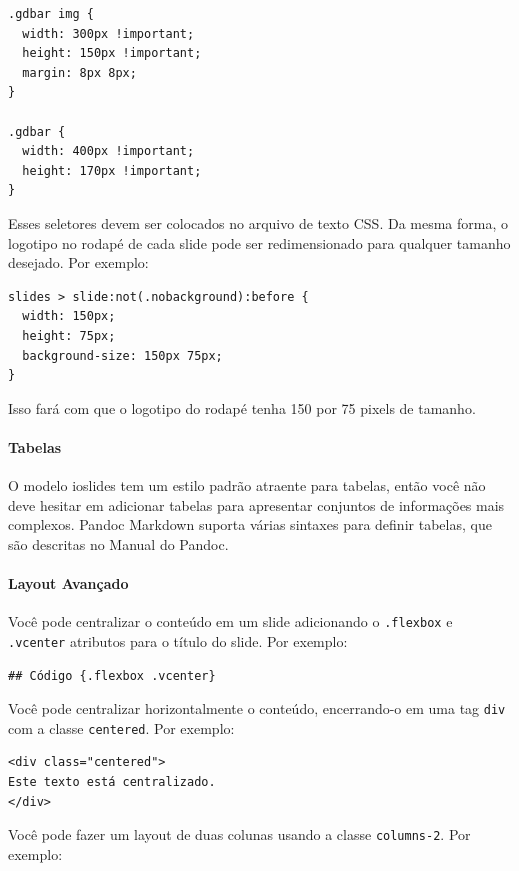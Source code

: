 \documentclass[
]{book}
\begin{document}
\begin{verbatim}
.gdbar img {
  width: 300px !important;
  height: 150px !important;
  margin: 8px 8px;
}

.gdbar {
  width: 400px !important;
  height: 170px !important;
}
\end{verbatim}

Esses seletores devem ser colocados no arquivo de texto CSS.
Da mesma forma, o logotipo no rodapé de cada slide pode ser redimensionado para qualquer tamanho desejado. Por exemplo:

\begin{verbatim}
slides > slide:not(.nobackground):before {
  width: 150px;
  height: 75px;
  background-size: 150px 75px;
}
\end{verbatim}

Isso fará com que o logotipo do rodapé tenha 150 por 75 pixels de tamanho.

\hypertarget{tabelas}{%
\paragraph{Tabelas}\label{tabelas}}

O modelo ioslides tem um estilo padrão atraente para tabelas, então você não deve hesitar em adicionar tabelas para apresentar conjuntos de informações mais complexos. Pandoc Markdown suporta várias sintaxes para definir tabelas, que são descritas no Manual do Pandoc.

\hypertarget{layout-avanuxe7ado}{%
\paragraph{Layout Avançado}\label{layout-avanuxe7ado}}

Você pode centralizar o conteúdo em um slide adicionando o \texttt{.flexbox} e \texttt{.vcenter} atributos para o título do slide.
Por exemplo:

\begin{verbatim}
## Código {.flexbox .vcenter}
\end{verbatim}

Você pode centralizar horizontalmente o conteúdo, encerrando-o em uma tag \texttt{div} com a classe \texttt{centered}. Por exemplo:

\begin{verbatim}
<div class="centered">
Este texto está centralizado.
</div>
\end{verbatim}

Você pode fazer um layout de duas colunas usando a classe \texttt{columns-2}. Por exemplo:
\end{document}
